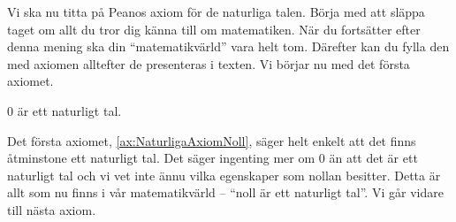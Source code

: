 
Vi ska nu titta på Peanos axiom för de naturliga talen.
Börja med att släppa taget om allt du tror dig känna till om matematiken.
När du fortsätter efter denna mening ska din \enquote{matematikvärld} vara helt 
tom.
Därefter kan du fylla den med axiomen alltefter de presenteras i texten.
Vi börjar nu med det första axiomet.
\begin{axiom}\label{ax:NaturligaAxiomNoll}
  \(0\) är ett naturligt tal. 
\end{axiom}
Det första axiomet, \cref{ax:NaturligaAxiomNoll}, säger helt enkelt att det
finns åtminstone ett naturligt tal.
Det säger ingenting mer om \(0\) än att det är ett naturligt tal och
vi vet inte ännu vilka egenskaper som nollan besitter.
Detta är allt som nu finns i vår matematikvärld -- \enquote{noll är ett 
  naturligt tal}.
Vi går vidare till nästa axiom.

